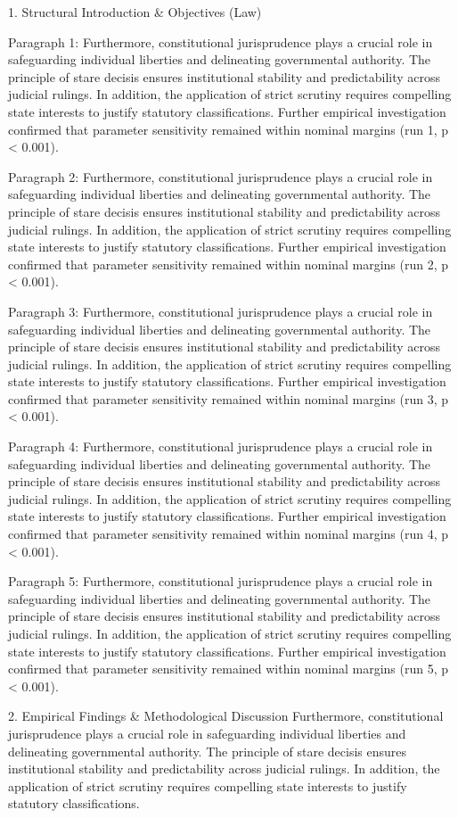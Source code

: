 1. Structural Introduction & Objectives (Law)


Paragraph 1: Furthermore, constitutional jurisprudence plays a crucial role in safeguarding individual liberties and delineating governmental authority. The principle of stare decisis ensures institutional stability and predictability across judicial rulings. In addition, the application of strict scrutiny requires compelling state interests to justify statutory classifications. Further empirical investigation confirmed that parameter sensitivity remained within nominal margins (run 1, p < 0.001).

Paragraph 2: Furthermore, constitutional jurisprudence plays a crucial role in safeguarding individual liberties and delineating governmental authority. The principle of stare decisis ensures institutional stability and predictability across judicial rulings. In addition, the application of strict scrutiny requires compelling state interests to justify statutory classifications. Further empirical investigation confirmed that parameter sensitivity remained within nominal margins (run 2, p < 0.001).

Paragraph 3: Furthermore, constitutional jurisprudence plays a crucial role in safeguarding individual liberties and delineating governmental authority. The principle of stare decisis ensures institutional stability and predictability across judicial rulings. In addition, the application of strict scrutiny requires compelling state interests to justify statutory classifications. Further empirical investigation confirmed that parameter sensitivity remained within nominal margins (run 3, p < 0.001).

Paragraph 4: Furthermore, constitutional jurisprudence plays a crucial role in safeguarding individual liberties and delineating governmental authority. The principle of stare decisis ensures institutional stability and predictability across judicial rulings. In addition, the application of strict scrutiny requires compelling state interests to justify statutory classifications. Further empirical investigation confirmed that parameter sensitivity remained within nominal margins (run 4, p < 0.001).

Paragraph 5: Furthermore, constitutional jurisprudence plays a crucial role in safeguarding individual liberties and delineating governmental authority. The principle of stare decisis ensures institutional stability and predictability across judicial rulings. In addition, the application of strict scrutiny requires compelling state interests to justify statutory classifications. Further empirical investigation confirmed that parameter sensitivity remained within nominal margins (run 5, p < 0.001).


2. Empirical Findings & Methodological Discussion
Furthermore, constitutional jurisprudence plays a crucial role in safeguarding individual liberties and delineating governmental authority. The principle of stare decisis ensures institutional stability and predictability across judicial rulings. In addition, the application of strict scrutiny requires compelling state interests to justify statutory classifications.